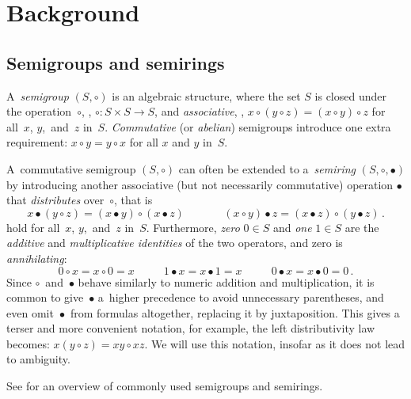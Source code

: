 \documentclass{toc}
\begin{document}
\section{Background} \label{sec:background}

\subsection{Semigroups and semirings}
A~\emph{semigroup} $(S, \circ)$ is an algebraic structure, where
the set $S$ is closed under the operation~$\circ$,
\ie, $\circ : S\times S \rightarrow S$,
and
\emph{associative}, \ie,
$x \circ (y \circ z) = (x \circ y) \circ z$ for all~$x$, $y$,~and~$z$
in~$S$.
\emph{Commutative} (or \emph{abelian}) semigroups introduce
one extra requirement: $x \circ y = y \circ x$ for all $x$ and $y$
in~$S$.

A~commutative semigroup $(S, \circ)$ can often be extended to
a~\emph{semiring} $(S, \circ, \bullet)$ by introducing
another associative (but not necessarily commutative)
operation $\bullet$ that \emph{distributes} over~$\circ$, that is
\[
x \bullet (y \circ z) = (x \bullet y) \circ (x \bullet z)~~~~~~~~~~~~~~~~(x \circ y) \bullet z = (x \bullet z) \circ (y \bullet z)\,.
\]
hold for all~$x$, $y$,~and~$z$ in~$S$.
Furthermore, \emph{zero} $0 \in S$ and \emph{one} $1 \in S$ are the
\emph{additive} and \emph{multiplicative identities} of the two operators,
and zero is \emph{annihilating}:
\[
0 \circ x = x \circ 0=x~~~~~~~~~~~~1 \bullet x = x \bullet 1 = x~~~~~~~~~~~~0 \bullet x = x \bullet 0 = 0\,.
\]
Since $\circ$~and~$\bullet$ behave
similarly to numeric addition and multiplication, it is common to
give~$\bullet$ a~higher precedence to avoid
unnecessary parentheses, and even omit~$\bullet$~from
formulas altogether, replacing it by juxtaposition.
This gives a terser and more convenient notation, for example, the left
distributivity law becomes: $x (y \circ z) = x y \circ x z$. We will use this
notation, insofar as it does not lead to ambiguity.

See  for an overview of commonly used semigroups and
semirings.



\end{document}

